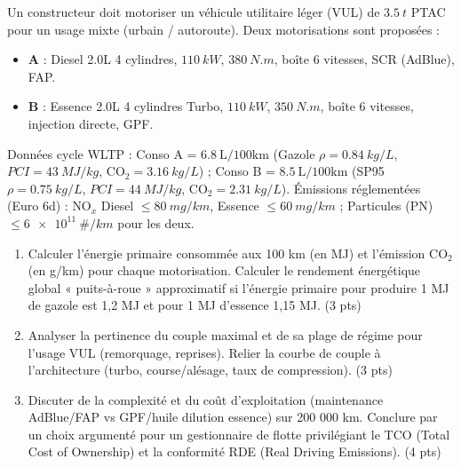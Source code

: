 \documentclass[11pt]{article}
\begin{document}
\begin{exercice}
Un constructeur doit motoriser un véhicule utilitaire léger (VUL) de $\SI{3,5}{t}$ PTAC pour un usage mixte (urbain / autoroute). Deux motorisations sont proposées :
\begin{itemize}
    \item \textbf{A} : Diesel 2.0L 4 cylindres, $\SI{110}{kW}$, $\SI{380}{N.m}$, boîte 6 vitesses, SCR (AdBlue), FAP.
    \item \textbf{B} : Essence 2.0L 4 cylindres Turbo, $\SI{110}{kW}$, $\SI{350}{N.m}$, boîte 6 vitesses, injection directe, GPF.
\end{itemize}
Données cycle WLTP : Conso A = $\SI{6,8}{\liter\per 100\kilo\meter}$ (Gazole $\rho=\SI{0,84}{kg/L}$, $PCI=\SI{43}{MJ/kg}$, $\text{CO}_2 = \SI{3,16}{kg/L}$) ; Conso B = $\SI{8,5}{\liter\per 100\kilo\meter}$ (SP95 $\rho=\SI{0,75}{kg/L}$, $PCI=\SI{44}{MJ/kg}$, $\text{CO}_2 = \SI{2,31}{kg/L}$). Émissions réglementées (Euro 6d) : $\text{NO}_x$ Diesel $\le \SI{80}{mg/km}$, Essence $\le \SI{60}{mg/km}$ ; Particules (PN) $\le \SI{6e11}{\#/km}$ pour les deux.
\begin{enumerate}
    \item Calculer l'énergie primaire consommée aux 100 km (en MJ) et l'émission $\text{CO}_2$ (en g/km) pour chaque motorisation. Calculer le rendement énergétique global « puits-à-roue » approximatif si l'énergie primaire pour produire 1 MJ de gazole est 1,2 MJ et pour 1 MJ d'essence 1,15 MJ. (3 pts)
    \item Analyser la pertinence du couple maximal et de sa plage de régime pour l'usage VUL (remorquage, reprises). Relier la courbe de couple à l'architecture (turbo, course/alésage, taux de compression). (3 pts)
    \item Discuter de la complexité et du coût d'exploitation (maintenance AdBlue/FAP vs GPF/huile dilution essence) sur 200 000 km. Conclure par un choix argumenté pour un gestionnaire de flotte privilégiant le TCO (Total Cost of Ownership) et la conformité RDE (Real Driving Emissions). (4 pts)
\end{enumerate}
\end{exercice}
\end{document}
